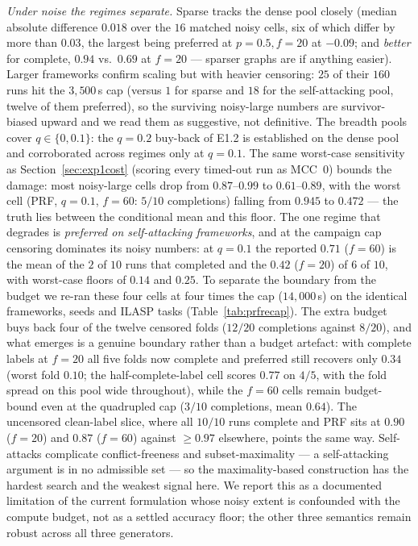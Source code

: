 \documentclass[review,12pt]{elsarticle}
\theoremstyle{definition}
\theoremstyle{remark}
\begin{document}
\emph{Under noise the regimes separate.} Sparse tracks the dense pool closely
(median absolute difference $0.018$ over the $16$ matched noisy cells, six of
which differ by more than $0.03$, the largest being preferred at
$p{=}0.5,f{=}20$ at $-0.09$; and \emph{better} for complete, $0.94$
vs.\ $0.69$ at $f{=}20$ --- sparser graphs are if anything easier). Larger
frameworks confirm scaling but with heavier censoring: $25$ of their $160$ runs
hit the $3{,}500$\,s cap (versus $1$ for sparse and $18$ for the
self-attacking pool, twelve of them preferred), so the surviving noisy-large
numbers are survivor-biased upward and we read them as suggestive, not
definitive. The breadth pools cover $q\in\{0,0.1\}$: the $q{=}0.2$ buy-back of
E1.2 is established on the dense pool and corroborated across regimes only at
$q{=}0.1$. The same worst-case sensitivity as Section~\ref{sec:exp1cost}
(scoring every timed-out run as MCC~$0$) bounds the damage: most noisy-large
cells drop from $0.87$--$0.99$ to $0.61$--$0.89$, with the worst cell (PRF,
$q{=}0.1$, $f{=}60$: $5/10$ completions) falling from $0.945$ to $0.472$ ---
the truth lies between the conditional mean and this floor. The one regime
that degrades is \emph{preferred on self-attacking frameworks}, and at the
campaign cap censoring dominates its noisy numbers: at $q{=}0.1$ the reported
$0.71$ ($f{=}60$) is the mean of the $2$ of $10$ runs that completed and the
$0.42$ ($f{=}20$) of $6$ of $10$, with worst-case floors of $0.14$ and $0.25$.
To separate the boundary from the budget we re-ran these four cells at four
times the cap ($14{,}000$\,s) on the identical frameworks, seeds and ILASP
tasks (Table~\ref{tab:prfrecap}). The extra budget buys back four of the
twelve censored folds ($12/20$ completions against $8/20$), and what emerges
is a genuine boundary rather than a budget artefact: with complete labels at
$f{=}20$ all five folds now complete and preferred still recovers only
$0.34$ (worst fold $0.10$; the half-complete-label cell scores $0.77$ on
$4/5$, with the fold spread on this pool wide throughout), while the $f{=}60$
cells remain budget-bound even at the quadrupled cap ($3/10$ completions,
mean $0.64$). The uncensored clean-label slice, where all $10/10$ runs
complete and PRF sits at $0.90$ ($f{=}20$) and $0.87$ ($f{=}60$) against
$\ge0.97$ elsewhere, points the same way. Self-attacks complicate conflict-freeness and
subset-maximality --- a self-attacking argument is in no admissible set --- so
the maximality-based construction has the hardest search and the weakest
signal here. We report this as a documented limitation of the current
formulation whose noisy extent is confounded with the compute budget, not as
a settled accuracy floor; the other three semantics remain robust across all
three generators.
\end{document}
